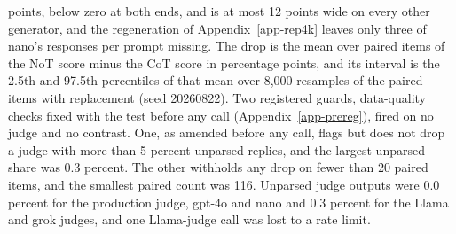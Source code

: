 points, below zero at both ends, and is at most 12 points wide on every other
generator, and the regeneration of Appendix~\ref{app-rep4k} leaves only three
of nano's responses per prompt missing.
The drop is the mean over paired items of the NoT score minus the CoT score
in percentage points, and its interval is the 2.5th and 97.5th percentiles
of that mean over 8,000 resamples of the paired items with replacement (seed
20260822). Two registered guards, data-quality checks fixed with the test
before any call (Appendix~\ref{app-prereg}), fired on no judge and no
contrast. One, as amended before any call, flags but does not drop a judge
with more than 5 percent unparsed replies, and the largest unparsed share was
0.3 percent. The other withholds any drop on fewer than 20 paired items, and
the smallest paired count was 116. Unparsed judge outputs were 0.0 percent for
the production judge, gpt-4o and nano and 0.3 percent for the Llama and grok judges, and
one Llama-judge call was lost to a rate limit.

